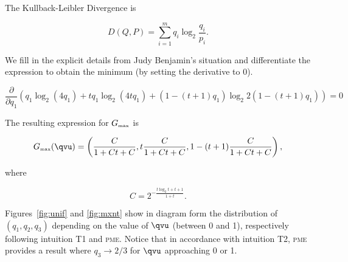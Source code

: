 \documentclass[phd,12pt,oneside]{ubcthesis}
\begin{document}
The Kullback-Leibler Divergence is

\begin{equation}
  \label{eq:gujeshoh}
  D(Q,P)=\sum_{i=1}^{m}q_{i}\log_{2}\frac{q_{i}}{p_{i}}.
\end{equation}

{\noindent}We fill in the explicit details from Judy Benjamin's situation and
differentiate the expression to obtain the minimum (by setting the
derivative to $0$). 

\begin{equation}
  \label{eq:ohyooquo}
\frac{\partial}{\partial{}q_{1}}(q_{1}\log_{2}(4q_{1})+tq_{1}\log_{2}(4tq_{1})+(1-(t+1)q_{1})\log_{2}2(1-(t+1)q_{1}))=0
\end{equation}

{\noindent}The resulting expression for $G_{\mbox{\tiny max}}$ is

\begin{equation}
  \label{eq:ahkoonae}
  G_{\mbox{\tiny max}}({\qvu})=\left(\frac{C}{1+Ct+C},t\frac{C}{1+Ct+C},1-(t+1)\frac{C}{1+Ct+C}\right),
\end{equation}

{\noindent}where

\begin{equation}
  \label{eq:johvulat}
  C=2^{-\frac{t\log_{2}t+t+1}{1+t}}.
\end{equation}

Figures~\ref{fig:unif} and \ref{fig:mxnt} show in diagram form the
distribution of $(q_{1},q_{2},q_{3})$ depending on the value of ${\qvu}$
(between 0 and 1), respectively following intuition T1 and
\textsc{pme}. Notice that in accordance with intuition T2,
\textsc{pme} provides a result where $q_{3}\rightarrow{}2/3$ for
${\qvu}$ approaching 0 or 1.
\end{document}
